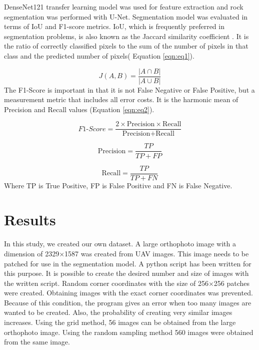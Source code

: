 \documentclass[a4paper,fleqn]{cas-sc}
\begin{document}
DenseNet121 transfer learning model was used for feature extraction and rock segmentation was performed with U-Net. Segmentation model was evaluated in terms of IoU and F1-score metrics. IoU, which is frequently preferred in segmentation problems, is also known as the Jaccard similarity coefficient \citep{jaccard1912distribution}. It is the ratio of correctly classified pixels to the sum of the number of pixels in that class and the predicted number of pixels( Equation \ref{eqn:eq1}). 

\begin{equation}
\label{eqn:eq1}
    J(A,B) = \frac{|A \cap B|}{|A \cup B|}
\end{equation}
The F1-Score is important in that it is not False Negative or False Positive, but a measurement metric that includes all error costs. It is the harmonic mean of Precision and Recall values (Equation \ref{eqn:eq2}).

\begin{equation}
\label{eqn:eq2}
F1\text{-}Score = \frac{2 \times \text{Precision} \times \text{Recall}}{\text{Precision} + \text{Recall}}
\end{equation}

\begin{equation}
\label{eqn:eq3}
\text{Precision} = \frac{TP}{TP + FP}
\end{equation}

\begin{equation}
\label{eqn:eq4}
\text{Recall} = \frac{TP}{TP + FN}
\end{equation}
Where TP is True Positive, FP is False Positive and FN is False Negative.


\section{Results}
In this study, we created our own dataset. A large orthophoto image with a dimension of 2329$\times$1587 was created from UAV images. This image needs to be patched for use in the segmentation model. A python script has been written for this purpose. It is possible to create the desired number and size of images with the written script. Random corner coordinates with the size of 256$\times$256 patches were created. Obtaining images with the exact corner coordinates was prevented. Because of this condition, the program gives an error when too many images are wanted to be created. Also, the probability of creating very similar images increases. Using the grid method, 56 images can be obtained from the large orthophoto image. Using the random sampling method 560 images were obtained from the same image.
\end{document}
